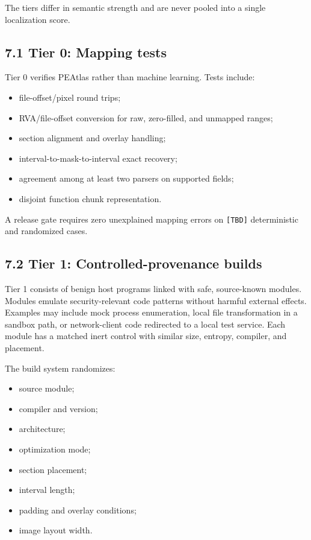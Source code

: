 \documentclass[
  10pt,
]{article}
\providecommand{\tightlist}{%
  \setlength{\itemsep}{0pt}\setlength{\parskip}{0pt}}
\begin{document}
The tiers differ in semantic strength and are never pooled into a single
localization score.

\subsection{7.1 Tier 0: Mapping tests}\label{tier-0-mapping-tests}

Tier 0 verifies PEAtlas rather than machine learning. Tests include:

\begin{itemize}
\tightlist
\item
  file-offset/pixel round trips;
\item
  RVA/file-offset conversion for raw, zero-filled, and unmapped ranges;
\item
  section alignment and overlay handling;
\item
  interval-to-mask-to-interval exact recovery;
\item
  agreement among at least two parsers on supported fields;
\item
  disjoint function chunk representation.
\end{itemize}

A release gate requires zero unexplained mapping errors on
\texttt{{[}TBD{]}} deterministic and randomized cases.

\subsection{7.2 Tier 1: Controlled-provenance
builds}\label{tier-1-controlled-provenance-builds}

Tier 1 consists of benign host programs linked with safe, source-known
modules. Modules emulate security-relevant code patterns without harmful
external effects. Examples may include mock process enumeration, local
file transformation in a sandbox path, or network-client code redirected
to a local test service. Each module has a matched inert control with
similar size, entropy, compiler, and placement.

The build system randomizes:

\begin{itemize}
\tightlist
\item
  source module;
\item
  compiler and version;
\item
  architecture;
\item
  optimization mode;
\item
  section placement;
\item
  interval length;
\item
  padding and overlay conditions;
\item
  image layout width.
\end{itemize}
\end{document}
